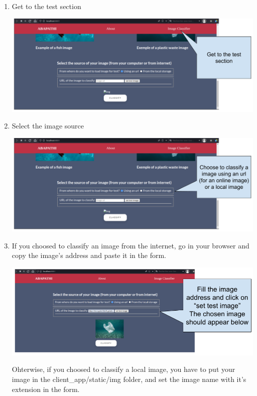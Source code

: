 \documentclass[a4paper, 12pt]{report}
\begin{document}
\begin{enumerate}

    \item Get to the test section

    \includegraphics[height = 0.40 \linewidth]{ill_1.png}

    \item Select the image source

    \includegraphics[height = 0.40 \linewidth]{ill_2.png}

    \item If you choosed to classify an image from the internet, go in your browser and copy the image's  address and paste it in the form.

    \includegraphics[height = 0.42 \linewidth]{ill_3.png}

    Ohterwise, if you choosed to classify a local image, you have to put your image in the client\_app/static/img folder, and set the image name with it's extension in the form.


\end{enumerate}
\end{document}
